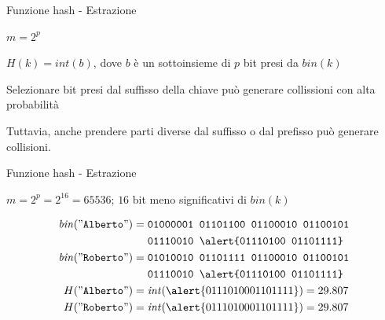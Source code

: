 \begin{frame}{Funzione hash - Estrazione}

\vspace{-6pt}
\begin{myboxtitle}[Estrazione]
\BIL
\item $m = 2^p$
\item $H(k) = \mathit{int}(b)$, dove $b$ è un sottoinsieme di $p$ bit presi da $\mathit{bin}(k)$
\EIL
\end{myboxtitle}

\BIL
\item Selezionare bit presi dal suffisso della chiave può generare collissioni
con alta probabilità
\item Tuttavia, anche prendere parti diverse dal suffisso o dal prefisso può generare collisioni.
\EIL
 
\end{frame}

\begin{frame}{Funzione hash - Estrazione}

\vspace{-6pt}
\begin{myboxtitle}[Esempio 1]
$m = 2^p = 2^{16} = 65536$; $16$ bit meno significativi di $\mathit{bin}(k)$

\begin{align*}
\mathit{bin}("\texttt{Alberto}") = {} & \texttt{01000001  01101100  01100010  01100101} \\ 
&  \texttt{01110010  \alert{01110100  01101111}}\\
\mathit{bin}("\texttt{Roberto}") = {} & \texttt{01010010  01101111  01100010  01100101} \\
&    \texttt{01110010  \alert{01110100  01101111}} \\
H("\texttt{Alberto}") = {} & \mathit{int}(\alert{01110100  01101111}) = 29.807 \\
H("\texttt{Roberto}") = {} & \mathit{int}(\alert{01110100  01101111}) = 29.807
\end{align*}
\end{myboxtitle}


\end{frame}


